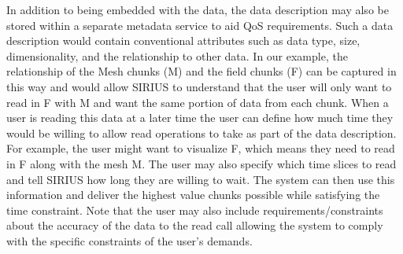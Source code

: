 
 
In addition to being embedded with the data, the data description may also be stored within 
a separate metadata service to aid QoS requirements. Such a data description would contain
conventional attributes such as data type, size, dimensionality, and the relationship to other 
data. In our example, the relationship of the Mesh chunks (M) and the field chunks (F) can 
be captured in this way and would allow SIRIUS to understand that the user will only 
want to read in F with M and want the same portion of data from each chunk. 
%
When a user is reading this data at a later time the user can define how much time they would 
be willing to allow read operations to take as part of the data description. For example, 
the user might want to visualize F, which means they need to read in F along with the mesh 
M. The user may also specify which time slices to read and tell SIRIUS how long they 
are willing to wait. The system can then use this information and deliver the highest value 
chunks possible while satisfying the time constraint.  Note that the user may also include 
requirements/constraints about the accuracy of the data to the read call
allowing the system to comply with the specific constraints of the user's demands.


